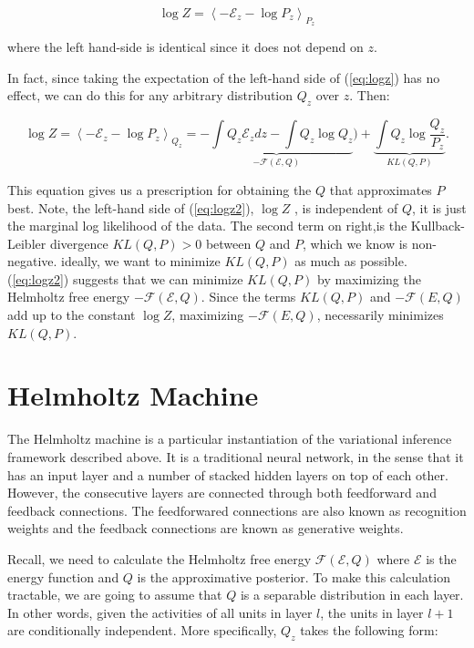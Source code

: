 \documentclass[11pt]{article}
\def\E{\mathcal{E}}
\def\F{\mathcal{F}}
\begin{document}
\begin{equation}
\log Z =  \left\langle -\E_z - \log P_z \right\rangle_{P_z}
\end{equation}

where the left hand-side is identical since it does not depend on $z$.

In fact, since taking the expectation of the left-hand side of (\ref{eq:logz}) has no effect, we can do this for any arbitrary distribution $Q_z$ over $z$. Then:

\begin{equation}
\log Z =  \left\langle -\E_z - \log P_z \right\rangle_{Q_z} = \underbrace{-\int Q_z \E_z dz - \int Q_z \log Q_z}_{-\F(\E, Q)}) + \underbrace{\int Q_z \log \frac{Q_z}{P_z}}_{KL(Q,P)}.
\label{eq:logz2}
\end{equation}

This equation gives us a prescription for obtaining the $Q$ that approximates $P$ best. Note, the left-hand side of (\ref{eq:logz2}), $\log Z$ , is independent of $Q$, it is just the marginal log likelihood of the data. The second term on right,is the Kullback-Leibler divergence $KL(Q,P) > 0$ between $Q$ and $P$, which we know is non-negative. ideally, we want to minimize $KL(Q,P)$ as much as possible. (\ref{eq:logz2}) suggests that we can minimize $KL(Q,P)$ by maximizing the Helmholtz free energy $-\F(\E,Q)$. Since the terms $KL(Q,P)$ and $-\F(E,Q)$ add up to the constant $\log Z$, maximizing $-\F(E,Q)$, necessarily minimizes $KL(Q,P)$.

\section{Helmholtz Machine}

The Helmholtz machine is a particular instantiation of the variational inference framework described above. It is a traditional neural network, in the sense that it has an input layer and a number of stacked hidden layers on top of each other. However, the consecutive layers are connected through both feedforward and feedback connections. The feedforwared connections are also known as recognition weights and the feedback connections are known as generative weights.

Recall, we need to calculate the Helmholtz free energy $\F(\E,Q)$ where $\E$ is the energy function and $Q$ is the approximative posterior. To make this calculation tractable, we are going to assume that $Q$ is a separable distribution in each layer. In other words, given the activities of all units in layer $l$, the units in layer $l+1$ are conditionally independent. More specifically, $Q_z$ takes the following form:
\end{document}
